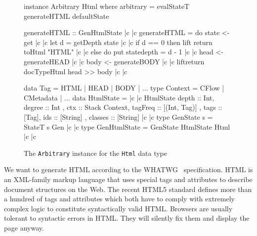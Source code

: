 \documentclass[sigconf,review]{acmart}
\begin{document}
\begin{figure}[t]
  \begin{haskell}
instance Arbitrary Html where
  arbitrary = evalStateT generateHTML defaultState

generateHTML :: GenHtmlState |c \label{ref.generateHTML.begin} |c
generateHTML = do
  state <- get |c \label{ref.generateHTML.getState} |c   
  let d = getDepth state |c \label{ref.generateHTML.getDepth} |c
  if d == 0
  then lift \dollar return \dollar toHtml "HTML" |c \label{ref.generateHTML.returnString} |c
  else do put state{depth = d - 1} |c \label{ref.generateHTML.updateState} |c
           head <- generateHEAD |c \label{ref.generateHTML.newHead} |c
           body <- generateBODY |c \label{ref.generateHTML.newBody} |c
           lift\dollar return \dollar docTypeHtml \dollar head >> body |c \label{ref.generateHTML.end} |c

data Tag = HTML | HEAD | BODY | ...
type Context = CFlow | CMetadata | ...
data HtmlState = |c \label{ref.HtmlState.begin} |c
  HtmlState { depth    :: Int,           degree  :: Int    
             , ctx     :: Stack Context, tagFreq :: [(Int, Tag)] 
             , tags    :: [Tag],         ids     :: [String]
             , classes :: [String] } |c \label{ref.HtmlState.end} |c
type GenState s = StateT s Gen |c \label{ref.GenState} |c
type GenHtmlState = GenState HtmlState Html |c \label{ref.GenHtmlState} |c
  \end{haskell}
  \caption{The \texttt{Arbitrary} instance for the \texttt{Html} data type}
  \label{fig.html.arb.def}
\end{figure}

We want to generate HTML according to the WHATWG~\cite{htmlspec} specification. HTML is an XML-family markup language that uses special tags and attributes to describe document structures on the Web. The recent HTML5 standard defines more than a hundred of tags and attributes which both have to comply with extremely complex logic to constitute  syntactically valid HTML. Browsers are usually tolerant to syntactic errors in HTML. They will silently fix them and display the page anyway.
\end{document}
